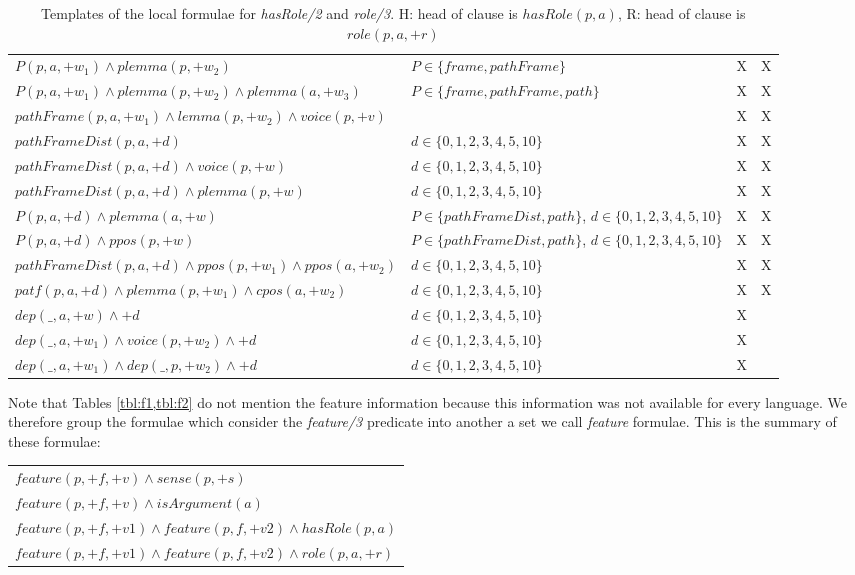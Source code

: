 \begin{table*}
\begin{tabular}{|p{8cm}|p{4cm}|c|c|}
   $ P(p,a,+w_1) \land plemma(p,+w_2) $ & $P \in \{frame,pathFrame\}$             & X & X \\
   $ P(p,a,+w_1) \land plemma(p,+w_2) \land plemma(a,+w_3) $    &   $P \in \{frame,pathFrame,path\}$   & X & X \\
   $ pathFrame(p,a,+w_1) \land lemma(p,+w_2) \land voice(p,+v) $ &            & X & X \\
   $ pathFrameDist(p,a,+d) $ &  $d \in \{0,1,2,3,4,5,10\}$           & X & X \\
   $ pathFrameDist(p,a,+d) \land voice(p,+w) $ &  $d \in \{0,1,2,3,4,5,10\}$           & X & X \\
   $ pathFrameDist(p,a,+d) \land plemma(p,+w) $ & $d \in \{0,1,2,3,4,5,10\}$           & X & X \\
   $ P(p,a,+d) \land plemma(a,+w) $ & $P \in \{pathFrameDist, path\}$, $d \in \{0,1,2,3,4,5,10\}$           & X & X \\
   $ P(p,a,+d) \land ppos(p,+w) $ & $P \in \{pathFrameDist, path\}$, $d \in \{0,1,2,3,4,5,10\}$           & X & X \\
   $ pathFrameDist(p,a,+d) \land ppos(p,+w_1) \land ppos(a,+w_2) $ & $d \in \{0,1,2,3,4,5,10\}$           & X & X \\
   $ patf(p,a,+d) \land plemma(p,+w_1) \land cpos(a,+w_2) $ & $d \in \{0,1,2,3,4,5,10\}$           & X & X \\
   $ dep(\_,a,+w) \land +d$    & $d \in \{0,1,2,3,4,5,10\}$ & X &   \\
   $ dep(\_,a,+w_1) \land voice(p,+w_2) \land +d$    & $d \in \{0,1,2,3,4,5,10\}$ & X &   \\
   $ dep(\_,a,+w_1) \land dep(\_,p,+w_2) \land +d$    & $d \in \{0,1,2,3,4,5,10\}$ & X &   \\
\hline
\end{tabular}
\caption{Templates of the local formulae for \emph{hasRole/2} and 
\emph{role/3}. H: head of clause is $hasRole(p,a)$, R: head of clause is 
$role(p,a,+r)$}
\label{tbl:f2}
\end{table*}

Note that Tables \ref{tbl:f1,tbl:f2} do not mention the feature information because 
this information was not available for every language. We therefore group the 
formulae which consider the \emph{feature/3} predicate into another a set we call 
\emph{feature} formulae. This is the summary of these formulae:
\begin{tabular}{p{7.0cm}}
   $ feature(p,+f,+v) \land sense(p,+s)    $\\
   $ feature(p,+f,+v) \land isArgument(a)    $\\
   $ feature(p,+f,+v1) \land feature(p,f,+v2) \land hasRole(p,a)    $\\
   $ feature(p,+f,+v1) \land feature(p,f,+v2) \land role(p,a,+r)   $\\
\end{tabular}


